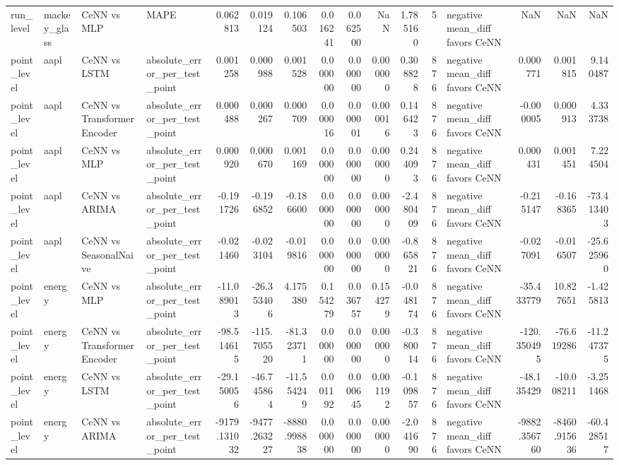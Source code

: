 \begin{tabular}{llllrrrrrrrrlrrr}
run_level & mackey_glass & CeNN vs MLP & MAPE & 0.062813 & 0.019124 & 0.106503 & 0.016241 & 0.062500 & NaN & 1.785160 & 5 & negative mean_diff favors CeNN & NaN & NaN & NaN \\
point_level & aapl & CeNN vs LSTM & absolute_error_per_test_point & 0.001258 & 0.000988 & 0.001528 & 0.000000 & 0.000000 & 0.000000 & 0.308828 & 876 & negative mean_diff favors CeNN & 0.000771 & 0.001815 & 9.140487 \\
point_level & aapl & CeNN vs TransformerEncoder & absolute_error_per_test_point & 0.000488 & 0.000267 & 0.000709 & 0.000016 & 0.000001 & 0.000016 & 0.146423 & 876 & negative mean_diff favors CeNN & -0.000005 & 0.000913 & 4.333738 \\
point_level & aapl & CeNN vs MLP & absolute_error_per_test_point & 0.000920 & 0.000670 & 0.001169 & 0.000000 & 0.000000 & 0.000000 & 0.244093 & 876 & negative mean_diff favors CeNN & 0.000431 & 0.001451 & 7.224504 \\
point_level & aapl & CeNN vs ARIMA & absolute_error_per_test_point & -0.191726 & -0.196852 & -0.186600 & 0.000000 & 0.000000 & 0.000000 & -2.480409 & 876 & negative mean_diff favors CeNN & -0.215147 & -0.168365 & -73.413403 \\
point_level & aapl & CeNN vs SeasonalNaive & absolute_error_per_test_point & -0.021460 & -0.023104 & -0.019816 & 0.000000 & 0.000000 & 0.000000 & -0.865821 & 876 & negative mean_diff favors CeNN & -0.027091 & -0.016507 & -25.625960 \\
point_level & energy & CeNN vs MLP & absolute_error_per_test_point & -11.089013 & -26.353406 & 4.175380 & 0.154279 & 0.036757 & 0.154279 & -0.048174 & 876 & negative mean_diff favors CeNN & -35.433779 & 10.827651 & -1.425813 \\
point_level & energy & CeNN vs TransformerEncoder & absolute_error_per_test_point & -98.514615 & -115.705520 & -81.323711 & 0.000000 & 0.000000 & 0.000000 & -0.380014 & 876 & negative mean_diff favors CeNN & -120.350495 & -76.619286 & -11.247375 \\
point_level & energy & CeNN vs LSTM & absolute_error_per_test_point & -29.150056 & -46.745864 & -11.554249 & 0.001192 & 0.000645 & 0.001192 & -0.109857 & 876 & negative mean_diff favors CeNN & -48.135429 & -10.008211 & -3.251468 \\
point_level & energy & CeNN vs ARIMA & absolute_error_per_test_point & -9179.131032 & -9477.263227 & -8880.998838 & 0.000000 & 0.000000 & 0.000000 & -2.041690 & 876 & negative mean_diff favors CeNN & -9882.356760 & -8460.915636 & -60.428517 \\

\end{tabular}
